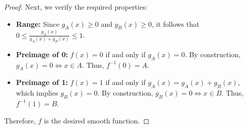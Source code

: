 \documentclass{article}
\begin{document}
\begin{proof}
Next, we verify the required properties:
\begin{itemize}
    \item \textbf{Range:} Since $g_A(x) \ge 0$ and $g_B(x) \ge 0$, it follows that $0 \le \frac{g_A(x)}{g_A(x) + g_B(x)} \le 1$.
    \item \textbf{Preimage of 0:} $f(x) = 0$ if and only if $g_A(x) = 0$. By construction, $g_A(x) = 0 \iff x \in A$. Thus, $f^{-1}(0) = A$.
    \item \textbf{Preimage of 1:} $f(x) = 1$ if and only if $g_A(x) = g_A(x) + g_B(x)$, which implies $g_B(x) = 0$. By construction, $g_B(x) = 0 \iff x \in B$. Thus, $f^{-1}(1) = B$.
\end{itemize}
Therefore, $f$ is the desired smooth function.
\end{proof}
\end{document}
